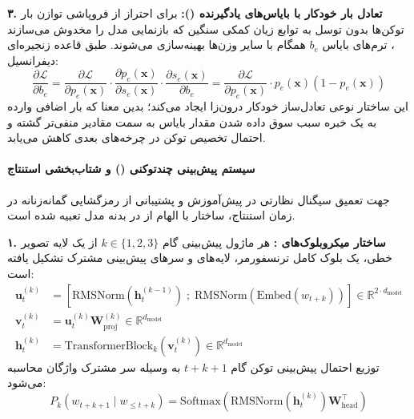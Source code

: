 \textbf{۳. تعادل بار خودکار با بایاس‌های یادگیرنده ():}
برای احتراز از فروپاشی توازن بار توکن‌ها بدون توسل به توابع زیان کمکی سنگین که بازنمایی مدل را مخدوش می‌سازند \cite{wang2024auxfree}، ترم‌های بایاس $b_e$ همگام با سایر وزن‌ها بهینه‌سازی می‌شوند. طبق قاعده زنجیره‌ای دیفرانسیل:
\begin{equation}
    \frac{\partial \mathcal{L}}{\partial b_e} = \frac{\partial \mathcal{L}}{\partial p_e(\mathbf{x})} \cdot \frac{\partial p_e(\mathbf{x})}{\partial s_e(\mathbf{x})} \cdot \frac{\partial s_e(\mathbf{x})}{\partial b_e} = \frac{\partial \mathcal{L}}{\partial p_e(\mathbf{x})} \cdot p_e(\mathbf{x}) (1 - p_e(\mathbf{x}))
\end{equation}
این ساختار نوعی تعادل‌ساز خودکار درون‌زا ایجاد می‌کند؛ بدین معنا که بار اضافی وارده به یک خبره سبب سوق داده شدن مقدار بایاس به سمت مقادیر منفی‌تر گشته و احتمال تخصیص توکن در چرخه‌های بعدی کاهش می‌یابد.

\paragraph*{سیستم پیش‌بینی چندتوکنی () و شتاب‌بخشی استنتاج}
جهت تعمیق سیگنال نظارتی در پیش‌آموزش و پشتیبانی از رمزگشایی گمانه‌زنانه در زمان استنتاج، ساختار  با الهام از \cite{gloeckle2024better, deepseek2024v3} در بدنه مدل تعبیه شده است.

\textbf{۱. ساختار میکروبلوک‌های :}
هر ماژول پیش‌بینی گام $k \in \{1, 2, 3\}$ از یک لایه تصویر خطی، یک بلوک کامل ترنسفورمر، لایه‌های  و سرهای پیش‌بینی مشترک تشکیل یافته است:
\begin{align}
    \mathbf{u}_t^{(k)} &= \left[ \text{RMSNorm}\left(\mathbf{h}_t^{(k-1)}\right) \;;\; \text{RMSNorm}\left(\text{Embed}(w_{t+k})\right) \right] \in \mathbb{R}^{2 \cdot d_{\text{model}}} \\
    \mathbf{v}_t^{(k)} &= \mathbf{u}_t^{(k)} \mathbf{W}_{\text{proj}}^{(k)} \in \mathbb{R}^{d_{\text{model}}} \\
    \mathbf{h}_t^{(k)} &= \text{TransformerBlock}_k\left(\mathbf{v}_t^{(k)}\right) \in \mathbb{R}^{d_{\text{model}}}
\end{align}
توزیع احتمال پیش‌بینی توکن گام $t+k+1$ به وسیله سر مشترک واژگان محاسبه می‌شود:
\begin{equation}
    P_k(w_{t+k+1} \mid w_{\le t+k}) = \text{Softmax}\left( \text{RMSNorm}\left(\mathbf{h}_t^{(k)}\right) \mathbf{W}_{\text{head}}^\top \right)
\end{equation}

